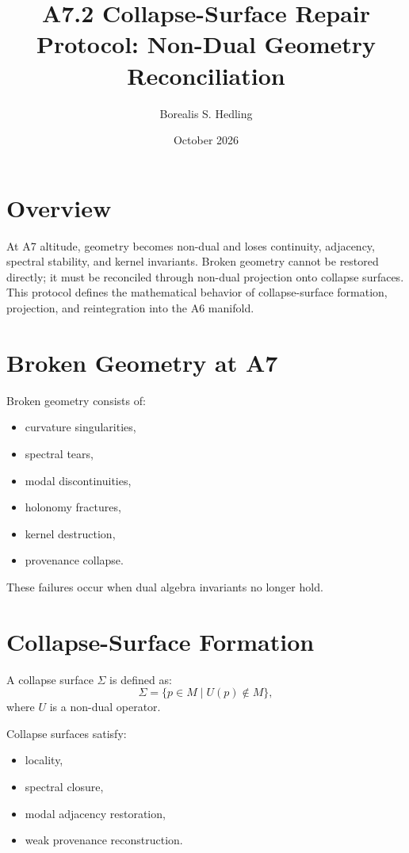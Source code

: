 \documentclass[11pt]{article}
\title{A7.2 Collapse-Surface Repair Protocol: Non-Dual Geometry Reconciliation}
\author{Borealis S. Hedling}
\date{October 2026}
\begin{document}
\maketitle

\section*{Overview}

At A7 altitude, geometry becomes non-dual and loses continuity, adjacency,
spectral stability, and kernel invariants. Broken geometry cannot be restored
directly; it must be reconciled through non-dual projection onto collapse
surfaces. This protocol defines the mathematical behavior of collapse-surface
formation, projection, and reintegration into the A6 manifold.

\section{Broken Geometry at A7}

Broken geometry consists of:
\begin{itemize}
  \item curvature singularities,
  \item spectral tears,
  \item modal discontinuities,
  \item holonomy fractures,
  \item kernel destruction,
  \item provenance collapse.
\end{itemize}

These failures occur when dual algebra invariants no longer hold.

\section{Collapse-Surface Formation}

A collapse surface $\Sigma$ is defined as:
\[
\Sigma = \{ p \in M \mid U(p) \notin M \},
\]
where $U$ is a non-dual operator.

Collapse surfaces satisfy:
\begin{itemize}
  \item locality,
  \item spectral closure,
  \item modal adjacency restoration,
  \item weak provenance reconstruction.
\end{itemize}
\end{document}
